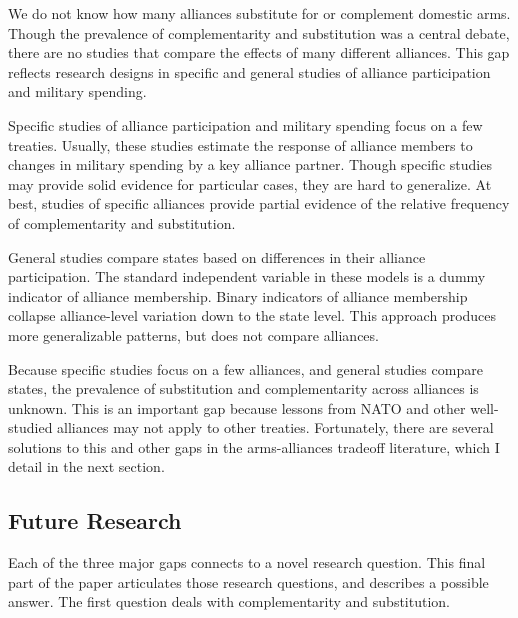 \documentclass[12pt]{article}
\begin{document}
We do not know how many alliances substitute for or complement domestic arms.
Though the prevalence of complementarity and substitution was a central debate, there are no studies that compare the effects of many different alliances. 
This gap reflects research designs in specific and general studies of alliance participation and military spending. 


Specific studies of alliance participation and military spending focus on a few treaties. 
Usually, these studies estimate the response of alliance members to changes in military spending by a key alliance partner. 
Though specific studies may provide solid evidence for particular cases, they are hard to generalize. 
At best, studies of specific alliances provide partial evidence of the relative frequency of complementarity and substitution. 


General studies compare states based on differences in their alliance participation. 
The standard independent variable in these models is a dummy indicator of alliance membership. 
Binary indicators of alliance membership collapse alliance-level variation down to the state level. 
This approach produces more generalizable patterns, but does not compare alliances.  


Because specific studies focus on a few alliances, and general studies compare states, the prevalence of substitution and complementarity across alliances is unknown. 
This is an important gap because lessons from NATO and other well-studied alliances may not apply to other treaties. 
Fortunately, there are several solutions to this and other gaps in the arms-alliances tradeoff literature, which I detail in the next section. 





\subsection{Future Research}

Each of the three major gaps connects to a novel research question. 
This final part of the paper articulates those research questions, and describes a possible answer.
The first question deals with complementarity and substitution. 
\end{document}
